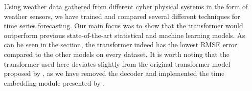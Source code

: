 
Using weather data gathered from different cyber physical systems in the form of weather sensors, we have trained and compared several different techniques for time series forecasting.
Our main focus was to show that the transformer would outperform previous state-of-the-art statistical and machine learning models.
As can be seen in the  section, the transformer indeed has the lowest RMSE error compared to the other models on every dataset. 
It is worth noting that the transformer used here deviates slightly from the original transformer model proposed by \citet{AttentionIsAllYouNeed}, as we have removed the decoder and implemented the time embedding module presented by \citet{time2vec}.